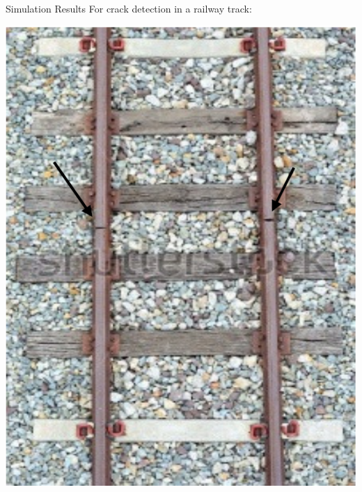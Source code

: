 
\begin{frame}{Simulation Results}
    For crack detection in a railway track:

    \vfill
    
    \centering
    \includegraphics[scale=0.3, angle=90]{figures/railway1.png}
\end{frame}


